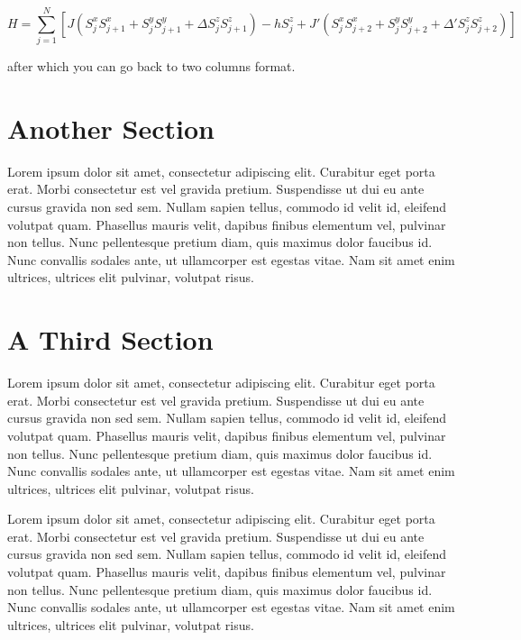 \documentclass[10pt]{article}
\begin{document}
\begin{equation}
H = \sum_{j=1}^N \left[J (S^x_j S^x_{j+1} + S^y_j S^y_{j+1} + \Delta S^z_j S^z_{j+1}) - h S^z_j + J' (S^x_j S^x_{j+2} + S^y_j S^y_{j+2} + \Delta' S^z_j S^z_{j+2}) \right]
\label{eq:HXXZnnn}
\end{equation}
\begin{multicols}{2}
after which you can go back to two columns format.

\section{Another Section}
Lorem ipsum dolor sit amet, consectetur adipiscing elit. Curabitur eget porta erat. Morbi consectetur est vel gravida pretium. Suspendisse ut dui eu ante cursus gravida non sed sem. Nullam sapien tellus, commodo id velit id, eleifend volutpat quam. Phasellus mauris velit, dapibus finibus elementum vel, pulvinar non tellus. Nunc pellentesque pretium diam, quis maximus dolor faucibus id. Nunc convallis sodales ante, ut ullamcorper est egestas vitae. Nam sit amet enim ultrices, ultrices elit pulvinar, volutpat risus.

\section{A Third Section}
Lorem ipsum dolor sit amet, consectetur adipiscing elit. Curabitur eget porta erat. Morbi consectetur est vel gravida pretium. Suspendisse ut dui eu ante cursus gravida non sed sem. Nullam sapien tellus, commodo id velit id, eleifend volutpat quam. Phasellus mauris velit, dapibus finibus elementum vel, pulvinar non tellus. Nunc pellentesque pretium diam, quis maximus dolor faucibus id. Nunc convallis sodales ante, ut ullamcorper est egestas vitae. Nam sit amet enim ultrices, ultrices elit pulvinar, volutpat risus.

Lorem ipsum dolor sit amet, consectetur adipiscing elit. Curabitur eget porta erat. Morbi consectetur est vel gravida pretium. Suspendisse ut dui eu ante cursus gravida non sed sem. Nullam sapien tellus, commodo id velit id, eleifend volutpat quam. Phasellus mauris velit, dapibus finibus elementum vel, pulvinar non tellus. Nunc pellentesque pretium diam, quis maximus dolor faucibus id. Nunc convallis sodales ante, ut ullamcorper est egestas vitae. Nam sit amet enim ultrices, ultrices elit pulvinar, volutpat risus.


\end{multicols}
\end{document}
